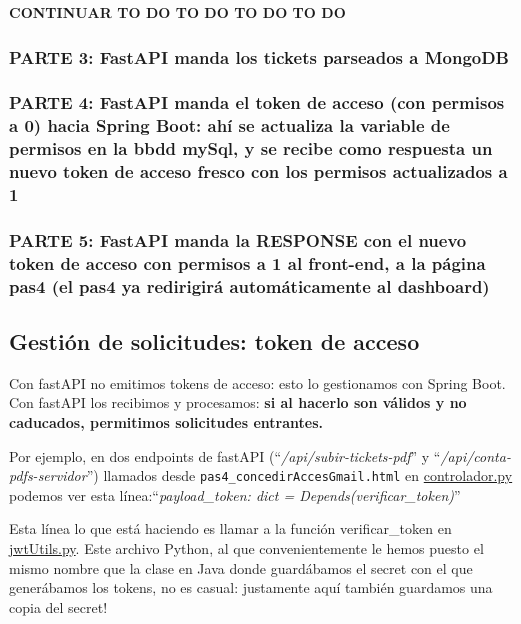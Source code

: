 \documentclass[a4paper,12pt]{report}
\begin{document}
		\textbf{CONTINUAR TO DO TO DO TO DO TO DO}
		
	
		
		\subsubsection{PARTE 3: FastAPI manda los tickets parseados a MongoDB}
		\label{sec:PARTE3_FASTAPI}
		
		\subsubsection{PARTE 4: FastAPI manda el token de acceso (con permisos a 0) hacia Spring Boot: ahí se actualiza la variable de permisos en la bbdd mySql, y se recibe como respuesta un nuevo token de acceso fresco con los permisos actualizados a 1}
		\label{sec:PARTE4_FASTAPI}
		
		\subsubsection{PARTE 5: FastAPI manda la \textbf{RESPONSE} con el nuevo token de acceso con permisos a 1 al front-end, a la página pas4 (el pas4 ya redirigirá automáticamente al dashboard)}
		\label{sec:PARTE5_FASTAPI}
	
	
	\subsection{Gestión de solicitudes: token de acceso}
	
	Con fastAPI no emitimos tokens de acceso: esto lo gestionamos con Spring Boot. Con fastAPI los recibimos y  procesamos: \textbf{si al hacerlo son válidos y no caducados, permitimos solicitudes entrantes.}
	
	Por ejemplo, en dos endpoints de fastAPI (``\textit{/api/subir-tickets-pdf}'' y ``\textit{/api/conta-pdfs-servidor}'') llamados desde \texttt{pas4\_concedirAccesGmail.html} en \href{https://github.com/blackcub3s/mercApp/blob/main/APP%20WEB/__FastAPI__/app/controlador.py}{controlador.py}  podemos ver esta línea:``\textit{payload\_token: dict = Depends(verificar\_token)}''
	 
	 Esta línea lo que está haciendo es llamar a la función verificar\_token en \href{https://github.com/blackcub3s/mercApp/blob/main/APP%20WEB/__FastAPI__/app/jwtUtil.py}{jwtUtils.py}. Este archivo Python, al que convenientemente le hemos puesto el mismo nombre que la clase en Java donde guardábamos el secret con el que generábamos los tokens, no es casual: justamente aquí también guardamos una copia del secret!
	
\end{document}

